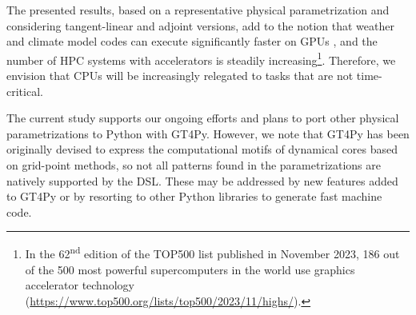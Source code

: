\documentclass[main.tex]{subfiles}
\begin{document}
        The presented results, based on a representative physical parametrization and considering tangent-linear and adjoint versions, add to the notion that weather and climate model codes can execute significantly faster on GPUs \citep{fuhrer18}, and the number of HPC systems with accelerators is steadily increasing\footnote{In the 62\textsuperscript{nd} edition of the TOP500 list published in November 2023, 186 out of the 500 most powerful supercomputers in the world use graphics accelerator technology (\url{https://www.top500.org/lists/top500/2023/11/highs/}).}. Therefore, we envision that CPUs will be increasingly relegated to tasks that are not time-critical.
    
    
        The current study supports our ongoing efforts and plans to port other physical parametrizations to Python with GT4Py. However, we note that GT4Py has been originally devised to express the computational motifs of dynamical cores based on grid-point methods, so not all patterns found in the parametrizations are natively supported by the DSL.  These  may be addressed by new features added to GT4Py or by resorting to other Python libraries to generate fast machine code.
        
    
\end{document}

